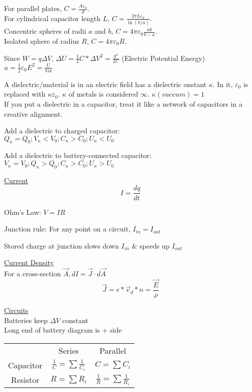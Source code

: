 \documentclass[8pt]{minimal}
\begin{document}
For parallel plates, $C = \frac{A \varepsilon_0}{d}$.\\
For cylindrical capacitor length $L$, $C = \frac{2\pi L\varepsilon_0}{\ln(b/a)}$.\\
Concentric spheres of radii $a$ and $b$, $C = 4\pi\varepsilon_0\frac{ab}{b - a}$.\\
Isolated sphere of radius $R$, $C = 4\pi\varepsilon_0 R$.

Since $W = q\Delta V$, $\Delta U = \frac{1}{2}C*\Delta V^2 = \frac{q^2}{2C}$ (Electric Potential Energy)\\
$u = \frac{1}{2}\varepsilon_0 E^2 = \frac{U}{Vol}$

A dielectric/material is in an electric field has a dielectric onstant $\kappa$.
In it, $\varepsilon_0$ is replaced with $\kappa\varepsilon_0$.
$\kappa$ of metals is considered $\infty$. $\kappa(vaccum) = 1$\\
If you put a dielectric in a capacitor, treat it like a network of capacitors in a creative alignment.

Add a dielectric to charged capacitor: \\\(Q_\kappa = Q_0; V_\kappa < V_0; C_\kappa > C_0; U_\kappa < U_0\)

Add a dielectric to battery-connected capacitor: \\\(V_\kappa = V_0; Q_\kappa > Q_0; C_\kappa > C_0; U_\kappa > U_0\)


\underline{Current}
\[ I = \frac{dq}{dt} \]

Ohm's Law: $V = IR$

Junction rule: For any point on a circuit, $I_{in} = I_{out}$

Stored charge at junction slows down $I_{in}$ \& speeds up $I_{out}$

\underline{Current Density}\\
For a cross-section $\vec{A}, dI = \vec{J} \cdot d\vec{A}$
\[\vec{J} = e*\vec{v}_d*n = \frac{\vec{E}}{\rho}\]


\underline{Circuits}\\
Batteries keep $\Delta V$ constant\\
Long end of battery diagram is + side\\
\begin{tabular}[width=\textwidth]{| c | c | c |}
                &Series                             &Parallel\\
    Capacitor   &$\frac{1}{C} = \sum \frac{1}{C_i}$ &$C = \sum C_i$\\
    Resistor    &$R = \sum R_i$                     &$\frac{1}{R} = \sum \frac{1}{R_i}$
\end{tabular}
\end{document}
